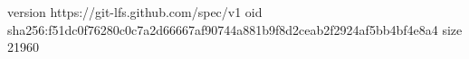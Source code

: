 version https://git-lfs.github.com/spec/v1
oid sha256:f51dc0f76280c0c7a2d66667af90744a881b9f8d2ceab2f2924af5bb4bf4e8a4
size 21960
